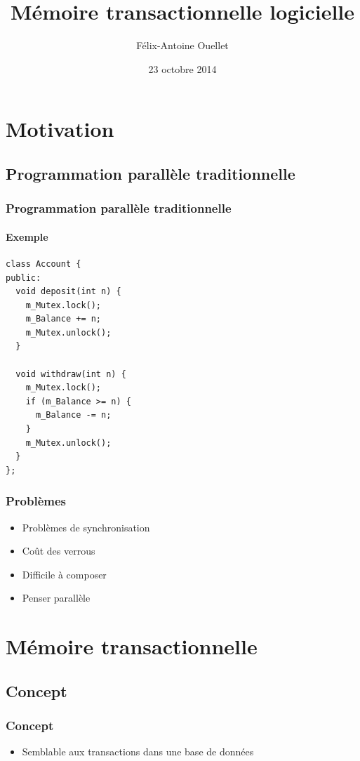 \documentclass{beamer}
\author[Félix-Antoine Ouellet]{Félix-Antoine Ouellet}
\title[MTL\hspace{2em}\insertframenumber/\inserttotalframenumber]{Mémoire transactionnelle logicielle}
\institute{Université de Sherbrooke}
\date{23 octobre 2014}
\begin{document}
\begin{frame}
\titlepage %
\end{frame}

\begin{frame}
\tableofcontents[hideallsubsections]
\end{frame}

\section{Motivation}
\subsection{Programmation parallèle traditionnelle}

\newlength\someheight
\setlength\someheight{3.5cm}

\begin{frame}[fragile]
\frametitle{Programmation parallèle traditionnelle}
\framesubtitle{Exemple}
\begin{adjustbox}{width=\textwidth,height=\someheight,keepaspectratio}
\begin{lstlisting}
class Account {
public:
  void deposit(int n) {
    m_Mutex.lock();
    m_Balance += n;
    m_Mutex.unlock();
  }

  void withdraw(int n) {
    m_Mutex.lock();
    if (m_Balance >= n) {
      m_Balance -= n;
    }
    m_Mutex.unlock();
  }
};
\end{lstlisting}
\end{adjustbox}
\end{frame}

\begin{frame}
\frametitle{Problèmes}
\begin{itemize}
\item Problèmes de synchronisation
\item<2-> Coût des verrous
\item<3-> Difficile à composer
\item<4-> Penser parallèle
\end{itemize}
\end{frame}

\section{Mémoire transactionnelle}
\subsection{Concept}
\begin{frame}
\frametitle{Concept}
\begin{itemize}
\item Semblable aux transactions dans une base de données
\end{itemize}
\end{frame}
\end{document}

